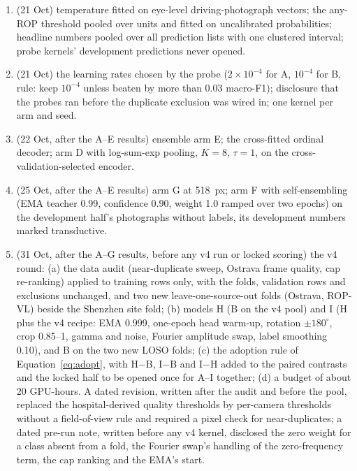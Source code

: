 \begin{enumerate}
\item[1.] (21 Oct) temperature fitted on eye-level driving-photograph vectors; the any-ROP threshold pooled over units and fitted on uncalibrated probabilities; headline numbers pooled over all prediction lists with one clustered interval; probe kernels' development predictions never opened.
\item[2.] (21 Oct) the learning rates chosen by the probe ($2\times10^{-4}$ for A, $10^{-4}$ for B, rule: keep $10^{-4}$ unless beaten by more than 0.03 macro-F1); disclosure that the probes ran before the duplicate exclusion was wired in; one kernel per arm and seed.
\item[3.] (22 Oct, after the A--E results) ensemble arm E; the cross-fitted ordinal decoder; arm D with log-sum-exp pooling, $K=8$, $\tau=1$, on the cross-validation-selected encoder.
\item[4.] (25 Oct, after the A--E results) arm G at 518~px; arm F with self-ensembling (EMA teacher 0.99, confidence 0.90, weight 1.0 ramped over two epochs) on the development half's photographs without labels, its development numbers marked transductive.
\item[5.] (31 Oct, after the A--G results, before any v4 run or locked scoring) the v4 round: (a) the data audit (near-duplicate sweep, Ostrava frame quality, cap re-ranking) applied to training rows only, with the folds, validation rows and exclusions unchanged, and two new leave-one-source-out folds (Ostrava, ROP-VL) beside the Shenzhen site fold; (b) models H (B on the v4 pool) and I (H plus the v4 recipe: EMA 0.999, one-epoch head warm-up, rotation $\pm180^\circ$, crop 0.85--1, gamma and noise, Fourier amplitude swap, label smoothing 0.10), and B on the two new LOSO folds; (c) the adoption rule of Equation~\ref{eq:adopt}, with H$-$B, I$-$B and I$-$H added to the paired contrasts and the locked half to be opened once for A--I together; (d) a budget of about 20 GPU-hours. A dated revision, written after the audit and before the pool, replaced the hospital-derived quality thresholds by per-camera thresholds without a field-of-view rule and required a pixel check for near-duplicates; a dated pre-run note, written before any v4 kernel, disclosed the zero weight for a class absent from a fold, the Fourier swap's handling of the zero-frequency term, the cap ranking and the EMA's start.
\end{enumerate}
